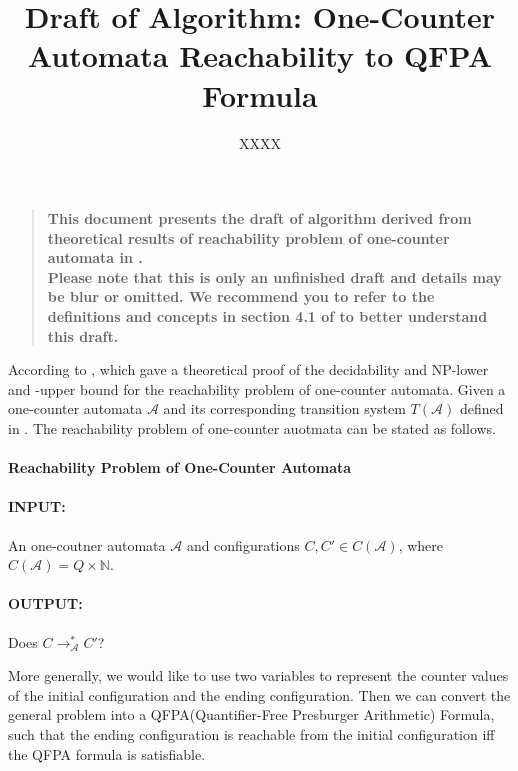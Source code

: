 \documentclass[12pt]{article}
\title{Draft of Algorithm: One-Counter Automata Reachability to QFPA Formula}
\author
{XXXX
}
\date{}
\newenvironment{sciabstract}{%
\begin{quote} \bf}
{\end{quote}}
\begin{document}
 


\baselineskip24pt


\maketitle 




\begin{sciabstract}
  This document presents the draft of algorithm derived from theoretical results of reachability problem of one-counter automata in \cite{DBLP:conf/icalp/ChistikovH17}.\\
  Please note that this is only an unfinished draft and details may be blur or omitted.
  We recommend you to refer to the definitions and concepts in section 4.1 of \cite{DBLP:conf/icalp/ChistikovH17} to better understand this draft.
\end{sciabstract}




According to \cite{DBLP:conf/icalp/ChistikovH17}, which gave a theoretical proof of the decidability and NP-lower and -upper bound for the reachability problem of one-counter automata. Given a one-counter automata $\mathcal{A}$ and its corresponding transition system $T(\mathcal{A})$ defined in \cite{DBLP:conf/icalp/ChistikovH17}. The reachability problem of one-counter auotmata can be stated as follows.

\paragraph{Reachability Problem of One-Counter Automata}

\paragraph{INPUT:} An one-coutner automata $\mathcal{A}$ and configurations $C, C'\in C(\mathcal{A})$, where $C(\mathcal{A}) = Q \times \mathbb{N}$.
\paragraph{OUTPUT:} Does $C \rightarrow^*_\mathcal{A} C'$?


More generally, we would like to use two variables to represent the counter values of the initial configuration and the ending configuration. Then we can convert the general problem into a QFPA(Quantifier-Free Presburger Arithmetic) Formula, such that the ending configuration is reachable from the initial configuration iff the QFPA formula is satisfiable.
\end{document}
